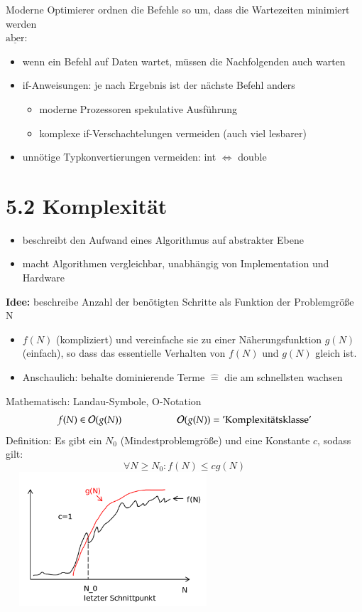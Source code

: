     \vspace*{-0.8cm}
    Moderne Optimierer ordnen die Befehle so um, dass die Wartezeiten minimiert werden\\
    $\underline{\text{aber}}$:
    \begin{itemize}
        \item wenn ein Befehl auf Daten wartet, müssen die Nachfolgenden auch warten
        \item if-Anweisungen: je nach Ergebnis ist der nächste Befehl anders
        \begin{itemize}[label={$\Rightarrow$}]
            \item moderne Prozessoren \glqq spekulative Ausführung\grqq
            \item komplexe if-Verschachtelungen vermeiden (auch viel lesbarer)
        \end{itemize}
        \item unnötige Typkonvertierungen vermeiden: int $\Leftrightarrow$ double
    \end{itemize}

\section*{5.2 Komplexität}
\begin{itemize}
    \item beschreibt den Aufwand eines Algorithmus auf abstrakter Ebene
    \item macht Algorithmen vergleichbar, unabhängig von Implementation und Hardware
\end{itemize}
\textbf{Idee:} beschreibe Anzahl der benötigten Schritte als Funktion der Problemgröße N
\begin{itemize}[label={}]
    \item $f(N)$ (kompliziert) und vereinfache sie zu einer Näherungsfunktion $g(N)$ (einfach), so dass das essentielle Verhalten von $f(N)$ und $g(N)$ gleich ist.
    \item Anschaulich: behalte dominierende Terme $\widehat{=}$ die am schnellsten wachsen
\end{itemize}
Mathematisch: Landau-Symbole, \glqq O-Notation\grqq \\
\[f(N) \in \mathcal O(g(N)) \hspace*{2cm} \mathcal O(g(N)) = \text{'Komplexitätsklasse'}\]
Definition: Es gibt ein $N_0$ (Mindestproblemgröße) und eine Konstante $c$, sodass gilt:
\[\forall N \geq N_0: f(N) \leq c g(N)\]
\includegraphics[width=8cm,height=5cm,keepaspectratio]{./Pictures/Komplexitaet.png}

